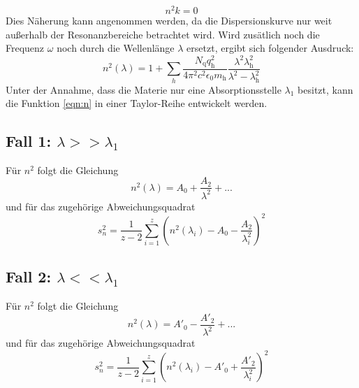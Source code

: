 \begin{equation*}
  n^2 k = 0
\end{equation*}
Dies Näherung kann angenommen werden, da die Dispersionskurve nur weit außerhalb der Resonanzbereiche betrachtet wird.
Wird zusätlich noch die Frequenz $\omega$ noch durch die Wellenlänge $\lambda$ ersetzt, ergibt sich folgender Ausdruck:
\begin{equation}
  n^2(\lambda) = 1 + \sum_h \frac{N_\text{q} q^2_\text{h}}{4 \pi^2 c^2 \epsilon_0 m_\text{h}} \frac{\lambda^2 \lambda^2_\text{h}}{\lambda^2 - \lambda^2_\text{h}}
  \label{eqn:n}
\end{equation}
Unter der Annahme, dass die Materie nur eine Absorptionsstelle $\lambda_1$ besitzt, kann die Funktion \eqref{eqn:n} in einer Taylor-Reihe entwickelt werden.

\subsection{Fall 1: \texorpdfstring{$\lambda >> \lambda_1$}{g}}

Für $n^2$ folgt die Gleichung
\begin{equation}
  n^2(\lambda) = A_0 + \frac{A_2}{\lambda^2} + ...
\end{equation}
und für das zugehörige Abweichungsquadrat
\begin{equation}
 s^2_n = \frac{1}{z-2} \sum_{i=1}^z \left(n^2(\lambda_i) - A_0 - \frac{A_2}{\lambda^2_i}\right)^2
\end{equation}

\subsection{Fall 2: \texorpdfstring{$\lambda << \lambda_1$}{k}}

Für $n^2$ folgt die Gleichung
\begin{equation}
  n^2(\lambda) = A'_0 - \frac{A'_2}{\lambda^2} + ...
\end{equation}
und für das zugehörige Abweichungsquadrat
\begin{equation}
  s^2_n = \frac{1}{z-2} \sum_{i=1}^z \left(n^2(\lambda_i) - A'_0 + \frac{A'_2}{\lambda^2_i}\right)^2
\end{equation}
